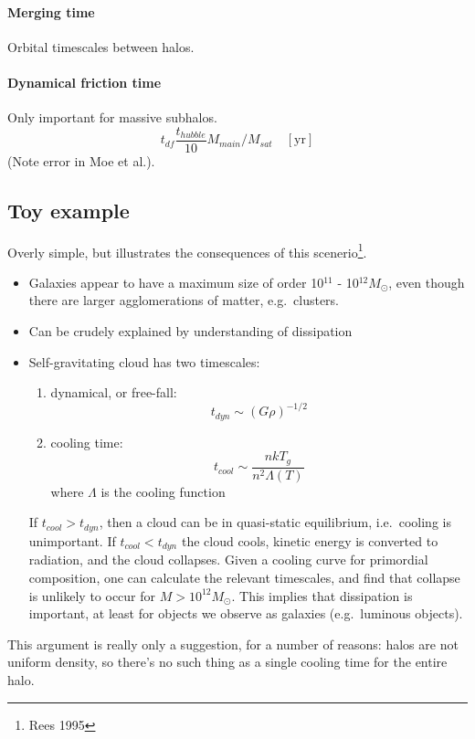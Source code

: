 \documentclass{article}
\begin{document}
\paragraph{Merging time}
Orbital timescales between halos.

\paragraph{Dynamical friction time}
Only important for massive subhalos.
\[
    t_{df} \frac{t_{hubble}}{10} M_{main}/M_{sat}\quad [\mathrm{yr}]
    \]
(Note error in Moe et al.).

\subsection{Toy example}
Overly simple, but illustrates the consequences of this scenerio\footnote{
Rees 1995}.
\begin{itemize}
    \item Galaxies appear to have a maximum size of order
        10$^{11}$ - 10$^{12} M_{\odot}$, even though there are larger
        agglomerations of matter, e.g.\ clusters.
    \item Can be crudely explained by understanding of dissipation
    \item Self-gravitating cloud has two timescales:
        \begin{enumerate}
            \item dynamical, or free-fall:
                \[
                    t_{dyn} \sim (G\rho)^{-1/2}
                \]
            \item cooling time:
                \[
                    t_{cool} \sim \frac{nkT_{g}}{n^{2}\Lambda(T)}
                \]
                where $\Lambda$ is the cooling function
        \end{enumerate}
        If $t_{cool} > t_{dyn}$, then a cloud can be in quasi-static
        equilibrium, i.e.\ cooling is unimportant. If $t_{cool} < t_{dyn}$
        the cloud cools, kinetic energy is converted to radiation, and
        the cloud collapses. Given a cooling curve for primordial
        composition, one can calculate the relevant timescales, and find
        that collapse is unlikely to occur for $M>10^{12}M_{\odot}$.
        This implies that dissipation is important, at least for
        objects we observe as galaxies (e.g.\ luminous objects).
\end{itemize}

This argument is really only a suggestion, for a number of reasons:
halos are not uniform density, so there's no such thing as a single
cooling time for the entire halo.
\end{document}
